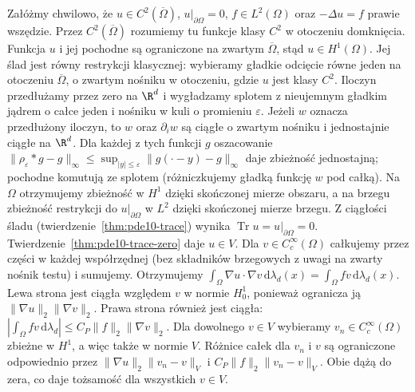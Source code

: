 \begin{przyklad}
\label{ex:pde11-poisson-weak}
Załóżmy chwilowo, że $u\in C^2(\overline\Omega)$,
$u|_{\partial\Omega}=0$, $f\in L^2(\Omega)$ oraz
$-\Delta u=f$ prawie wszędzie. Przez $C^2(\overline\Omega)$
rozumiemy tu funkcje klasy $C^2$ w otoczeniu domknięcia.
Funkcja $u$ i jej pochodne są ograniczone na zwartym
$\overline\Omega$, stąd $u\in H^1(\Omega)$.
Jej ślad jest równy restrykcji klasycznej: wybieramy gładkie
odcięcie równe jeden na otoczeniu $\overline\Omega$,
o zwartym nośniku w otoczeniu, gdzie $u$ jest klasy $C^2$.
Iloczyn przedłużamy przez zero na $\R^d$ i wygładzamy
splotem z nieujemnym gładkim jądrem o całce jeden
i nośniku w kuli o promieniu $\varepsilon$.
Jeżeli $w$ oznacza przedłużony iloczyn, to $w$ oraz
$\partial_i w$ są ciągłe o zwartym nośniku i jednostajnie
ciągłe na $\R^d$. Dla każdej z tych funkcji $g$
oszacowanie
$\|\rho_\varepsilon*g-g\|_\infty
\le\sup_{|y|\le\varepsilon}\|g(\cdot-y)-g\|_\infty$
daje zbieżność jednostajną; pochodne komutują ze
splotem (różniczkujemy gładką funkcję $w$ pod całką).
Na $\Omega$ otrzymujemy zbieżność w $H^1$ dzięki
skończonej mierze obszaru, a na brzegu zbieżność
restrykcji do $u|_{\partial\Omega}$ w $L^2$
dzięki skończonej mierze brzegu.
Z ciągłości śladu (twierdzenie~\ref{thm:pde10-trace})
wynika $\operatorname{Tr}u=u|_{\partial\Omega}=0$.
Twierdzenie~\ref{thm:pde10-trace-zero} daje $u\in V$.
Dla $v\in C_c^\infty(\Omega)$ całkujemy przez części
w każdej współrzędnej (bez składników brzegowych z uwagi
na zwarty nośnik testu) i sumujemy. Otrzymujemy
$\int_\Omega\nabla u\cdot\nabla v\,\mathrm d\lambda_d(x)
=\int_\Omega fv\,\mathrm d\lambda_d(x)$.
Lewa strona jest ciągła względem $v$ w normie $H_0^1$,
ponieważ ogranicza ją $\|\nabla u\|_2\|\nabla v\|_2$.
Prawa strona również jest ciągła:
$|\int_\Omega fv\,\mathrm d\lambda_d|
\le C_P\|f\|_2\|\nabla v\|_2$.
Dla dowolnego $v\in V$ wybieramy $v_n\in C_c^\infty(\Omega)$
zbieżne w $H^1$, a więc także w normie $V$. Różnice
całek dla $v_n$ i $v$ są ograniczone odpowiednio przez
$\|\nabla u\|_2\|v_n-v\|_V$ i $C_P\|f\|_2\|v_n-v\|_V$.
Obie dążą do zera, co daje tożsamość dla wszystkich $v\in V$.
\end{przyklad}

